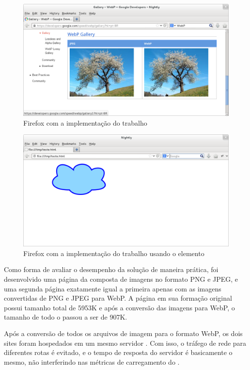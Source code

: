 \documentclass[espaco=simples,appendix=Name]{abnt}
\begin{document}
\begin{figure}[h]
  \centering
    \includegraphics[scale=0.4]{FirefoxComWebP.png}
  \caption{Firefox com a implementação do trabalho}
\end{figure}

\begin{figure}[h]
  \centering
    \includegraphics[scale=0.4]{HTML5CanvasFirefoxWebP.png}
  \caption{Firefox com a implementação do trabalho usando o elemento }
\end{figure}

Como forma de avaliar o desempenho da solução de maneira prática, foi desenvolvido uma página da  composta de imagens no formato PNG e JPEG, e uma segunda página exatamente igual a primeira apenas com as imagens convertidas de PNG e JPEG para WebP. A página em sua formação original possui tamanho total de 5953K e após a conversão das imagens para WebP, o tamanho de todo o  passou a ser de 907K. 

Após a conversão de todos os arquivos de imagem para o formato WebP, os dois sites foram hospedados em um mesmo servidor . Com isso, o tráfego de rede para diferentes rotas é evitado, e o tempo de resposta do servidor é basicamente o mesmo, não interferindo nas métricas de carregamento do . 
\end{document}
